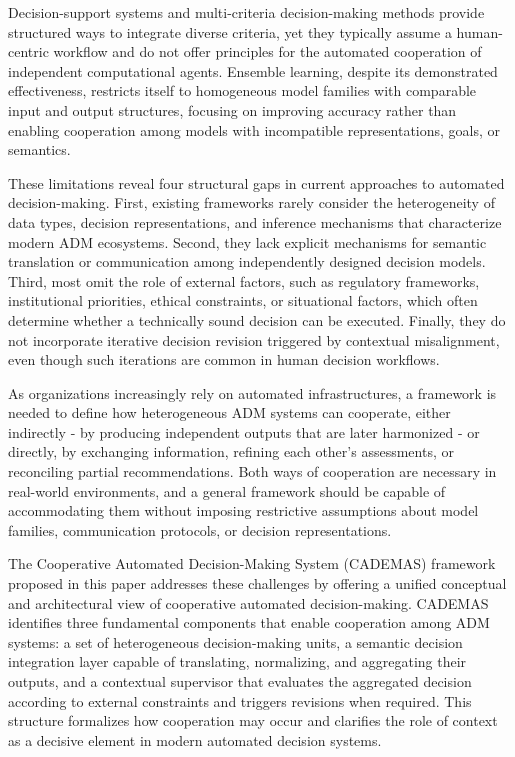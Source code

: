 \documentclass[letterpaper, 10 pt,conference]{IEEEconf}
\begin{document}
Decision-support systems and multi-criteria decision-making methods provide structured ways to integrate diverse criteria, yet they typically assume a human-centric workflow and do not offer principles for the automated cooperation of independent computational agents. Ensemble learning, despite its demonstrated effectiveness, restricts itself to homogeneous model families with comparable input and output structures, focusing on improving accuracy rather than enabling cooperation among models with incompatible representations, goals, or semantics.

These limitations reveal four structural gaps in current approaches to automated decision-making. First, existing frameworks rarely consider the heterogeneity of data types, decision representations, and inference mechanisms that characterize modern ADM ecosystems. Second, they lack explicit mechanisms for semantic translation or communication among independently designed decision models. Third, most omit the role of external factors, such as regulatory frameworks, institutional priorities, ethical constraints, or situational factors, which often determine whether a technically sound decision can be executed. Finally, they do not incorporate iterative decision revision triggered by contextual misalignment, even though such iterations are common in human decision workflows.

As organizations increasingly rely on automated infrastructures, a framework is needed to define how heterogeneous ADM systems can cooperate, either indirectly - by producing independent outputs that are later harmonized - or directly, by exchanging information, refining each other’s assessments, or reconciling partial recommendations. Both ways of cooperation are necessary in real-world environments, and a general framework should be capable of accommodating them without imposing restrictive assumptions about model families, communication protocols, or decision representations.

The Cooperative Automated Decision-Making System (CADEMAS) framework proposed in this paper addresses these challenges by offering a unified conceptual and architectural view of cooperative automated decision-making. CADEMAS identifies three fundamental components that enable cooperation among ADM systems: a set of heterogeneous decision-making units, a semantic decision integration layer capable of translating, normalizing, and aggregating their outputs, and a contextual supervisor that evaluates the aggregated decision according to external constraints and triggers revisions when required. This structure formalizes how cooperation may occur and clarifies the role of context as a decisive element in modern automated decision systems.
\end{document}
